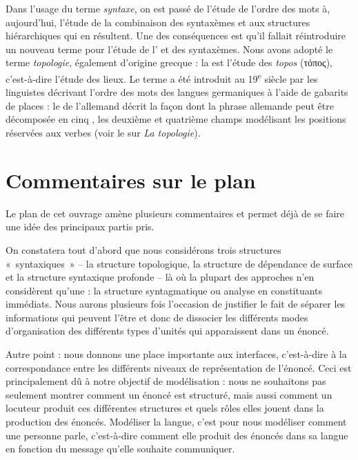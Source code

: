 {    Dans l’usage du terme \textit{syntaxe}, on est passé de l’étude de l’ordre des mots à, aujourd’hui, l’étude de la combinaison des syntaxèmes et aux structures hiérarchiques qui en résultent. Une des conséquences est qu’il fallait réintroduire un nouveau terme pour l’étude de l’ et des syntaxèmes. Nous avons adopté le terme \textit{topologie}, également d’origine grecque : la  est l’étude des \textit{topos} (τόπος), c’est-à-dire l’étude des lieux. Le terme a été introduit au 19\textsuperscript{e} siècle par les linguistes décrivant l’ordre des mots des langues germaniques à l’aide de gabarits de places : le  de l’allemand décrit la façon dont la phrase allemande peut être décomposée en cinq , les deuxième et quatrième champs modélisant les positions réservées aux verbes (voir le  sur \textit{La topologie}).
}
\section{Commentaires sur le plan}\label{sec:0.0.10}

Le plan de cet ouvrage amène plusieurs commentaires et permet déjà de se faire une idée des principaux partis pris.

\begin{sloppypar}
On constatera tout d’abord que nous considérons trois structures «~syntaxiques~» – la structure topologique, la structure de dépendance de surface et la structure syntaxique profonde – là où la plupart des approches n’en considèrent qu’une : la structure syntagmatique ou analyse en constituants immédiats. Nous aurons plusieurs fois l’occasion de justifier le fait de séparer les informations qui peuvent l’être et donc de dissocier les différents modes d’organisation des différents types d’unités qui apparaissent dans un énoncé.
\end{sloppypar}

Autre point : nous donnons une place importante aux interfaces, c’est-à-dire à la correspondance entre les différents niveaux de représentation de l’énoncé. Ceci est principalement dû à notre objectif de modélisation : nous ne souhaitons pas seulement montrer comment un énoncé est structuré, mais aussi comment un locuteur produit ces différentes structures et quels rôles elles jouent dans la production des énoncés. Modéliser la langue, c’est pour nous modéliser comment une personne parle, c’est-à-dire comment elle produit des énoncés dans sa langue en fonction du message qu’elle souhaite communiquer.

